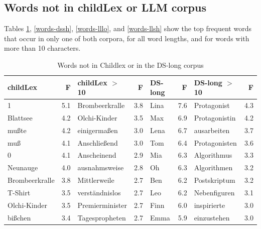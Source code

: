 \documentclass[doc, a4paper, anonymous]{apa7}
\begin{document}
\clearpage  


\subsection{Words not in childLex or LLM corpus}

Tables \ref{words-dslo}, \ref{words-dssh}, \ref{words-lllo}, and \ref{words-llsh} show the top frequent words that occur in only one of both corpora, for all word lengths, and for words with more than 10 characters.

\begin{table}[!htbp]
\caption{Words not in Childlex or in the DS-long corpus}
\centering
\begin{tabular}{lrlrlrlr}
  \hline
childLex & F & childLex $>$10 & F & DS-long & F & DS-long $>$10 & F \\ 
  \hline
1 & 5.1 & Brombeerkralle & 3.8 & Lina & 7.6 & Protagonist & 4.3 \\ 
  Blattsee & 4.2 & Olchi-Kinder & 3.5 & Max & 6.9 & Protagonistin & 4.2 \\ 
  mußte & 4.2 & einigermaßen & 3.0 & Lena & 6.7 & ausarbeiten & 3.7 \\ 
  muß & 4.1 & Anschließend & 3.0 & Tom & 6.4 & Protagonisten & 3.6 \\ 
  0 & 4.1 & Anscheinend & 2.9 & Mia & 6.3 & Algorithmus & 3.3 \\ 
  Neunauge & 4.0 & ausnahmsweise & 2.8 & Oh & 6.3 & Algorithmen & 3.2 \\ 
  Brombeerkralle & 3.8 & Mittlerweile & 2.7 & Ben & 6.2 & Postskriptum & 3.2 \\ 
  T-Shirt & 3.5 & verständnislos & 2.7 & Leo & 6.2 & Nebenfiguren & 3.1 \\ 
  Olchi-Kinder & 3.5 & Premierminister & 2.7 & Finn & 6.0 & inspirierte & 3.0 \\ 
  bißchen & 3.4 & Tagespropheten & 2.7 & Emma & 5.9 & einzustehen & 3.0 \\ 
   \hline
\end{tabular}
\label{words-dslo}
\end{table}
\end{document}
